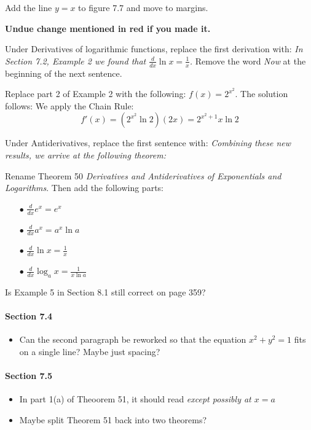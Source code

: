 \documentclass[12pt]{report}
\begin{document}
\begin{itemize}
\item Add the line $y=x$ to figure 7.7 and move to margins.

{\color{red} {\bfseries Undue change mentioned in red if you made it.}
\item Under Derivatives of logarithmic functions, replace the first derivation with: \emph{In Section 7.2, Example 2 we found that $\frac{d}{dx}\ln x=\frac1x$.} Remove the word \emph{Now} at the beginning of the next sentence.}

\item Replace part 2 of Example 2 with the following: $f(x)=2^{x^2}$. The solution follows:
We apply the Chain Rule: \[ f'(x)=\left(2^{x^2}\ln 2\right)(2x)=2^{x^2+1}x\ln 2\]

\item Under Antiderivatives, replace the first sentence with: \emph{Combining these new results, we arrive at the following theorem:}

\item Rename Theorem 50 \emph{Derivatives and Antiderivatives of Exponentials and Logarithms}. Then add the following parts: 
\begin{itemize}
\item[$\bullet$] $\frac{d}{dx} e^x=e^x$
\item[$\bullet$] $\frac{d}{dx}a^x=a^x\ln a$
\item[$\bullet$] $\frac{d}{dx} \ln x=\frac 1x$ 
\item[$\bullet$] $\frac{d}{dx}\log_ax=\frac 1{x\ln a}$
\end{itemize}

\item Is Example 5 in Section 8.1 still correct on page 359?
\end{itemize}

\paragraph{Section 7.4}

\begin{itemize}
\item Can the second paragraph be reworked so that the equation $x^2+y^2=1$ fits on a single line? Maybe just spacing?
\end{itemize}

\paragraph{Section 7.5}

\begin{itemize}
\item In part 1(a) of Theoorem 51, it should read \emph{except possibly at $x=a$}

\item Maybe split Theorem 51 back into two theorems?
\end{itemize}
\end{document}
